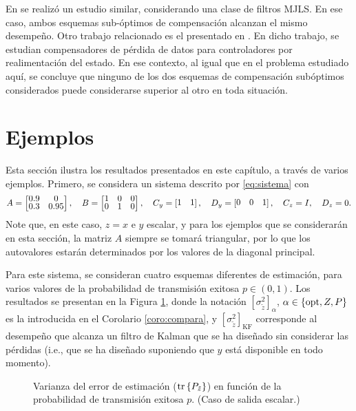 \begin{obs}
En \cite{figoge11} se realiz\'o un estudio similar, considerando una clase de filtros MJLS. En ese caso, ambos esquemas sub-\'optimos de compensaci\'on alcanzan el mismo desempe\~no. Otro trabajo relacionado es el presentado en \cite{schena09}. En dicho trabajo, se estudian compensadores de p\'erdida de datos para controladores por realimentaci\'on del estado. En ese contexto, al igual que en el problema estudiado aqu\'i, se concluye que ninguno de los dos esquemas de compensaci\'on sub\'optimos considerados puede considerarse superior al otro en toda situaci\'on.
\end{obs}

\section{Ejemplos}\label{subsec:ejemplos_mimo}

Esta secci\'on ilustra los resultados presentados en este cap\'itulo, a trav\'es de varios ejemplos. Primero, se considera un sistema descrito por \eqref{eq:sistema} con
\begin{align*}
\renewcommand{\arraystretch}{0.75}
A = \matriz{ 0.9 & 0 \\ 0.3 & 0.95 }, \quad B = \matriz{ 1 & 0 & 0 \\ 0 & 1 & 0 }, \quad
C_y = \matriz{ 1 & 1 }, \quad D_y = \matriz{ 0 & 0 & 1 }, \quad C_z = I, \quad D_z=0.
\end{align*}
Note que, en este caso, $z=x$ e $y$ escalar, y para los ejemplos que se considerar\'an en esta secci\'on, la matriz $A$ siempre se tomar\'a triangular, por lo que los autovalores estar\'an determinados por los valores de la diagonal principal.

Para este sistema, se consideran cuatro esquemas diferentes de estimaci\'on, para varios valores de la probabilidad de transmisi\'on exitosa $p \in \left(0,1\right)$. Los resultados se presentan en la Figura \ref{fig:example-miso}, donde la notaci\'on $[\sigma_{\tilde{z}}^2]_{\alpha}$, $\alpha \in \{\operatorname{opt}, Z,P \}$ es la introducida en el Corolario \ref{coro:compara}, y $[\sigma_{\tilde{z}}^2]_{\operatorname{KF}}$ corresponde al desempe\~no que alcanza un filtro de Kalman que se ha dise\~nado sin considerar las p\'erdidas (i.e., que se ha dise\~nado suponiendo que $y$ est\'a disponible en todo momento).

\begin{figure}[htbp]
\centering
{}
\caption{Varianza del error de estimaci\'on ($\operatorname{tr}\left\{ P_{\tilde{z}} \right\}$) en funci\'on de la probabilidad de transmisi\'on exitosa $p$. (Caso de salida escalar.)}
\label{fig:example-miso}
\end{figure}

